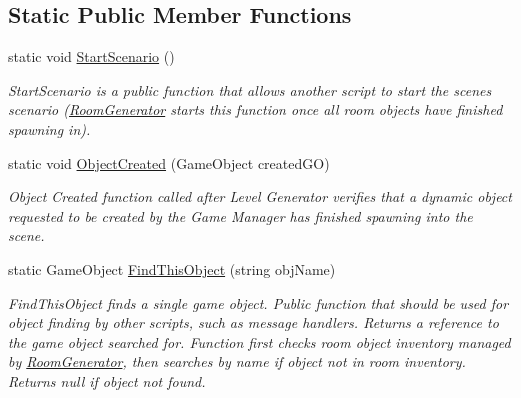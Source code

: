 \subsection*{Static Public Member Functions}
\begin{DoxyCompactItemize}
\item 
static void \hyperlink{class_game_manager_a0a09751dc063771cce98baeaff6dca56}{Start\+Scenario} ()\hypertarget{class_game_manager_a0a09751dc063771cce98baeaff6dca56}{}\label{class_game_manager_a0a09751dc063771cce98baeaff6dca56}

\begin{DoxyCompactList}\small\item\em Start\+Scenario is a public function that allows another script to start the scene\textquotesingle{}s scenario (\hyperlink{class_room_generator}{Room\+Generator} starts this function once all room objects have finished spawning in). \end{DoxyCompactList}\item 
static void \hyperlink{class_game_manager_af79e05cc1c84a19d49af65f7e8b63b97}{Object\+Created} (Game\+Object created\+GO)\hypertarget{class_game_manager_af79e05cc1c84a19d49af65f7e8b63b97}{}\label{class_game_manager_af79e05cc1c84a19d49af65f7e8b63b97}

\begin{DoxyCompactList}\small\item\em Object Created function called after Level Generator verifies that a dynamic object requested to be created by the Game Manager has finished spawning into the scene. \end{DoxyCompactList}\item 
static Game\+Object \hyperlink{class_game_manager_a9b6d25273c6357c9baee92434fa2cbf2}{Find\+This\+Object} (string obj\+Name)\hypertarget{class_game_manager_a9b6d25273c6357c9baee92434fa2cbf2}{}\label{class_game_manager_a9b6d25273c6357c9baee92434fa2cbf2}

\begin{DoxyCompactList}\small\item\em Find\+This\+Object finds a single game object. Public function that should be used for object finding by other scripts, such as message handlers. Returns a reference to the game object searched for. Function first checks room object inventory managed by \hyperlink{class_room_generator}{Room\+Generator}, then searches by name if object not in room inventory. Returns null if object not found. \end{DoxyCompactList}\end{DoxyCompactItemize}
